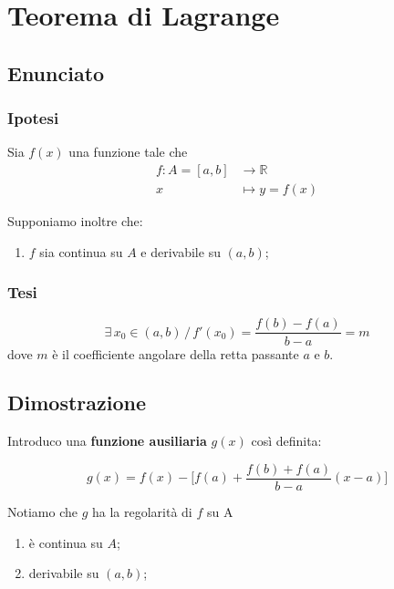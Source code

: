 \documentclass[../dimostrazioni]{subfiles}
\begin{document}
    \chapter{Teorema di Lagrange}

        \section*{Enunciato}

        \subsection*{Ipotesi}

            Sia \(f(x)\) una funzione tale che
            \begin{align*}
                f : A = [a, b] &\longrightarrow \mathbb{R}\\
                x &\longmapsto y = f(x) 
            \end{align*}

            Supponiamo inoltre che:

            \begin{enumerate}
                \indentitem \item \(f\) sia continua su \(A\) e derivabile su \((a, b)\);
            \end{enumerate}

        \subsection*{Tesi}

            \[ \exists \, x_0 \in (a,b) \, / \, f'(x_0) = \frac{f(b)-f(a)}{b-a}=m \]
            dove \(m\) è il coefficiente angolare della retta passante \(a\) e \(b\).

        \section*{Dimostrazione}

            \medskip

            Introduco una \textbf{funzione ausiliaria} \(g(x)\) così definita:

            \[ g(x) = f(x) - \bigg[f(a) + \frac{f(b) + f(a)}{b - a}(x - a) \bigg] \]

            Notiamo che \(g\) ha la regolarità di \(f\) su A
            \begin{enumerate}
                \indentitem \item è continua su \( A \);
                \indentitem \item derivabile su \( (a, b) \);
            \end{enumerate}
\end{document}

